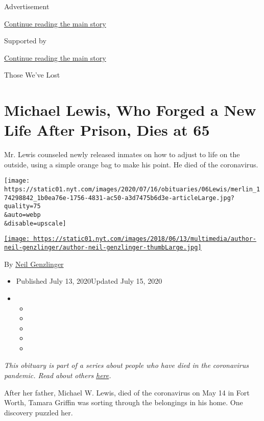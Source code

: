 Advertisement

\protect\hyperlink{after-top}{Continue reading the main story}

Supported by

\protect\hyperlink{after-sponsor}{Continue reading the main story}

Those We've Lost

\hypertarget{michael-lewis-who-forged-a-new-life-after-prison-dies-at-65}{%
\section{Michael Lewis, Who Forged a New Life After Prison, Dies at
65}\label{michael-lewis-who-forged-a-new-life-after-prison-dies-at-65}}

Mr. Lewis counseled newly released inmates on how to adjust to life on
the outside, using a simple orange bag to make his point. He died of the
coronavirus.

\texttt{[image: https://static01.nyt.com/images/2020/07/16/obituaries/06Lewis/merlin\_174298842\_1b0ea76e-1756-4831-ac50-a3d7475b6d3e-articleLarge.jpg?quality=75\\\&auto=webp\\\&disable=upscale]}

\href{https://www.nytimes.com/by/neil-genzlinger}{\texttt{[image: https://static01.nyt.com/images/2018/06/13/multimedia/author-neil-genzlinger/author-neil-genzlinger-thumbLarge.jpg]}}

By \href{https://www.nytimes.com/by/neil-genzlinger}{Neil Genzlinger}

\begin{itemize}
\item
  Published July 13, 2020Updated July 15, 2020
\item
  \begin{itemize}
  \item
  \item
  \item
  \item
  \item
  \end{itemize}
\end{itemize}

\emph{This obituary is part of a series about people who have died in
the coronavirus pandemic. Read about others}
\href{https://www.nytimes.com/interactive/2020/obituaries/people-died-coronavirus-obituaries.html}{\emph{here}}\emph{.}

After her father, Michael W. Lewis, died of the coronavirus on May 14 in
Fort Worth, Tamara Griffin was sorting through the belongings in his
home. One discovery puzzled her.

